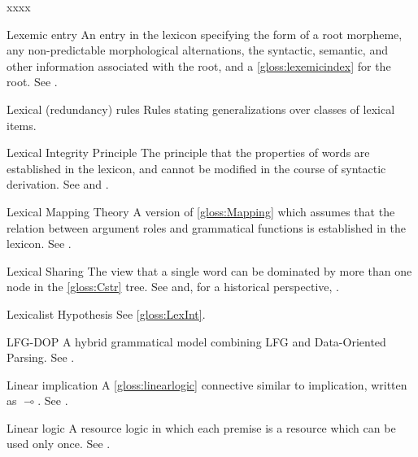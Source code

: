 \documentclass[output=paper,colorlinks,citecolor=brown]{langscibook}
\begin{document}
\begin{labeling}{xxxx}
\item[Lexemic entry] An entry in the lexicon specifying the form of a root morpheme, any non-predictable morphological alternations, the syntactic, semantic, and other information associated with the root, and a \ref{gloss:lexemicindex} for the root.  See .

\item[Lexical (redundancy) rules] Rules stating generalizations over classes of lexical items.

\item[Lexical Integrity Principle\namedlabel{gloss:LexInt}{Lexical Integrity Principle}] The principle that the properties of words are established in the lexicon, and cannot be modified in the course of syntactic derivation.  See \citetv[\ref{sect:integrity}]{chapters/CoreConcepts} and .

\item[Lexical Mapping Theory\namedlabel{gloss:LMT}{Lexical Mapping Theory}] A version of \ref{gloss:Mapping} which assumes that the relation between argument roles and grammatical functions is established in the lexicon.  See .

\item[Lexical Sharing\namedlabel{gloss:lexsharing}{lexical sharing}] The view that a single word can be dominated by more than one node in the \ref{gloss:Cstr} tree.  See \citetv[\ref{sec:CoreConcepts:LexSharing}]{chapters/CoreConcepts} and, for a historical perspective, \citetv[\ref{sec:Historical:lex-share}]{chapters/Historical}.

\item[Lexicalist Hypothesis] See \ref{gloss:LexInt}.

\item[LFG-DOP] A hybrid grammatical model combining LFG and Data-Oriented Parsing.  See .

\item[Linear implication\namedlabel{gloss:LinearImplication}{Linear implication}] A \ref{gloss:linearlogic} connective similar to implication, written as $\multimap$. See .

\item[Linear logic\namedlabel{gloss:LinearLogic}{Linear logic}\namedlabel{gloss:linearlogic}{linear logic}] A resource logic in which each premise is a resource which can be used only once.  See .


\end{labeling}
\end{document}
